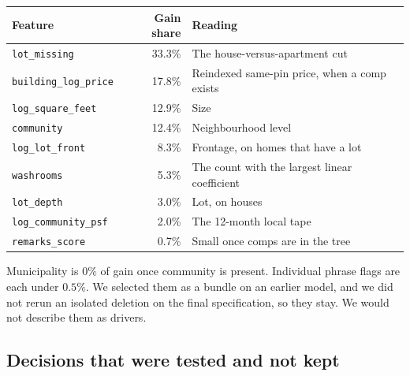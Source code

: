 \documentclass[11pt]{article}
\begin{document}
\begin{center}
\begin{tabular}{lr l}
\toprule
Feature & Gain share & Reading \\
\midrule
\texttt{lot\_missing} & 33.3\% & The house-versus-apartment cut \\
\texttt{building\_log\_price} & 17.8\% & Reindexed same-pin price, when a comp exists \\
\texttt{log\_square\_feet} & 12.9\% & Size \\
\texttt{community} & 12.4\% & Neighbourhood level \\
\texttt{log\_lot\_front} & 8.3\% & Frontage, on homes that have a lot \\
\texttt{washrooms} & 5.3\% & The count with the largest linear coefficient \\
\texttt{lot\_depth} & 3.0\% & Lot, on houses \\
\texttt{log\_community\_psf} & 2.0\% & The 12-month local tape \\
\texttt{remarks\_score} & 0.7\% & Small once comps are in the tree \\
\bottomrule
\end{tabular}
\end{center}

Municipality is \(0\%\) of gain once community is present. Individual phrase flags are each under \(0.5\%\). We selected them as a bundle on an earlier model, and we did not rerun an isolated deletion on the final specification, so they stay. We would not describe them as drivers.

\subsection{Decisions that were tested and not kept}
\end{document}
